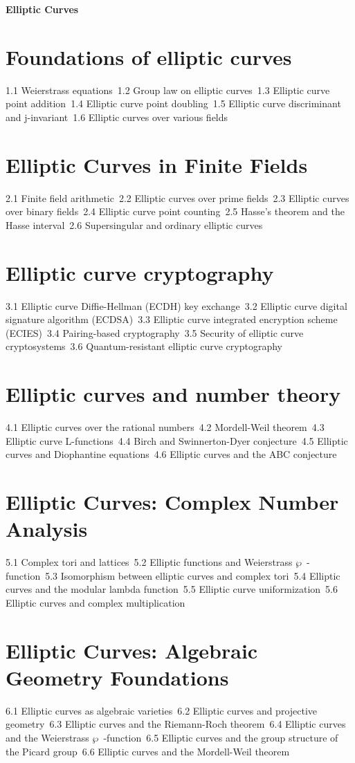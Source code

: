 {\LARGE \bf{Elliptic Curves}}
\section{Foundations of elliptic curves}
1.1 Weierstrass equations\
1.2 Group law on elliptic curves\
1.3 Elliptic curve point addition\
1.4 Elliptic curve point doubling\
1.5 Elliptic curve discriminant and j-invariant\
1.6 Elliptic curves over various fields\
\section{Elliptic Curves in Finite Fields}
2.1 Finite field arithmetic\
2.2 Elliptic curves over prime fields\
2.3 Elliptic curves over binary fields\
2.4 Elliptic curve point counting\
2.5 Hasse's theorem and the Hasse interval\
2.6 Supersingular and ordinary elliptic curves\
\section{Elliptic curve cryptography}
3.1 Elliptic curve Diffie-Hellman (ECDH) key exchange\
3.2 Elliptic curve digital signature algorithm (ECDSA)\
3.3 Elliptic curve integrated encryption scheme (ECIES)\
3.4 Pairing-based cryptography\
3.5 Security of elliptic curve cryptosystems\
3.6 Quantum-resistant elliptic curve cryptography\
\section{Elliptic curves and number theory}
4.1 Elliptic curves over the rational numbers\
4.2 Mordell-Weil theorem\
4.3 Elliptic curve L-functions\
4.4 Birch and Swinnerton-Dyer conjecture\
4.5 Elliptic curves and Diophantine equations\
4.6 Elliptic curves and the ABC conjecture\
\section{Elliptic Curves: Complex Number Analysis}
5.1 Complex tori and lattices\
5.2 Elliptic functions and Weierstrass $\wp$\ -function\
5.3 Isomorphism between elliptic curves and complex tori\
5.4 Elliptic curves and the modular lambda function\
5.5 Elliptic curve uniformization\
5.6 Elliptic curves and complex multiplication\
\section{Elliptic Curves: Algebraic Geometry Foundations}
6.1 Elliptic curves as algebraic varieties\
6.2 Elliptic curves and projective geometry\
6.3 Elliptic curves and the Riemann-Roch theorem\
6.4 Elliptic curves and the Weierstrass $\wp$\ -function\
6.5 Elliptic curves and the group structure of the Picard group\
6.6 Elliptic curves and the Mordell-Weil theorem\
